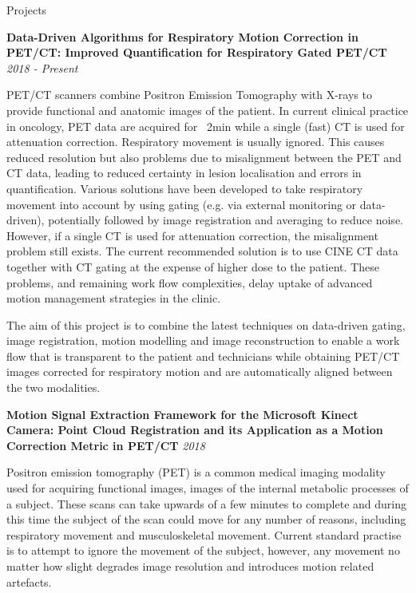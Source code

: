 \documentclass{cv} %
\begin{document}
\begin{rSection}{Projects}

{\bf Data-Driven Algorithms for Respiratory Motion Correction in PET/CT: Improved Quantification for Respiratory Gated PET/CT} \hfill {\em 2018 - Present} 

\item PET/CT scanners combine Positron Emission Tomography with X-rays to provide functional and anatomic images of the patient. In current clinical practice in oncology, PET data are acquired for ~2min while a single (fast) CT is used for attenuation correction. Respiratory movement is usually ignored. This causes reduced resolution but also problems due to misalignment between the PET and CT data, leading to reduced certainty in lesion localisation and errors in quantification. Various solutions have been developed to take respiratory movement into account by using gating (e.g. via external monitoring or data-driven), potentially followed by image registration and averaging to reduce noise. However, if a single CT is used for attenuation correction, the misalignment problem still exists. The current recommended solution is to use CINE CT data together with CT gating at the expense of higher dose to the patient. These problems, and remaining work flow complexities, delay uptake of advanced motion management strategies in the clinic.

\item The aim of this project is to combine the latest techniques on data-driven gating, image registration, motion modelling and image reconstruction to enable a work flow that is transparent to the patient and technicians while obtaining PET/CT images corrected for respiratory motion and are automatically aligned between the two modalities.

{\bf Motion Signal Extraction Framework for the Microsoft Kinect Camera: Point Cloud Registration and its Application as a Motion Correction Metric in PET/CT} \hfill {\em 2018} 

\item Positron emission tomography (PET) is a common medical imaging modality used for acquiring functional images, images of the internal metabolic processes of a subject. These scans can take upwards of a few minutes to complete and during this time the subject of the scan could move for any number of reasons, including respiratory movement and musculoskeletal movement. Current standard practise is to attempt to ignore the movement of the subject, however, any movement no matter how slight degrades image resolution and introduces motion related artefacts.


\end{rSection}
\end{document}
